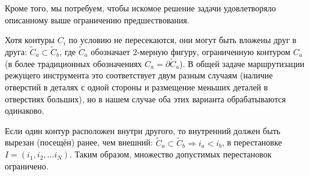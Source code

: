 Кроме того,
мы потребуем,
чтобы искомое решение задачи
удовлетворяло
описанному выше
ограничению предшествования.

Хотя контуры
$C_i$
по условию не пересекаются,
они могут быть вложены друг в друга:
\( \widetilde C_a \subset \widetilde C_b \),
где
$\widetilde C_a$
обозначает 2-мерную фигуру,
ограниченную контуром
$C_a$
(в более традиционных обозначениях
$C_a = \partial \widetilde C_a$).
В общей задаче маршрутизации
режущего инструмента это
соответствует двум разным случаям
(наличие отверстий в деталях с одной стороны
и размещение меньших деталей в отверстиях больших),
но в нашем случае оба этих
варианта обрабатываются одинаково.

Если один контур расположен внутри другого,
то внутренний должен быть вырезан
(посещён)
ранее, чем внешний:
\( \widetilde C_a \subset \widetilde C_b \Rightarrow i_a < i_b \),
в перестановке
$I = (i_1, i_2, ... i_N)$.
Таким образом,
множество допустимых перестановок ограничено.
